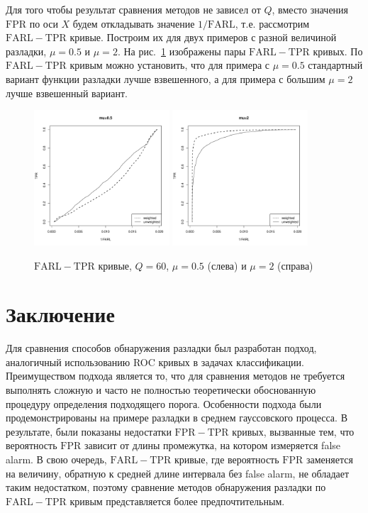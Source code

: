 \documentclass{math-mech-sci}
\newcommand{\FPR}{\mathrm{FPR}}
\newcommand{\TPR}{\mathrm{TPR}}
\newcommand{\FARL}{\mathrm{FARL}}
\begin{document}
Для того чтобы результат сравнения методов не зависел от $Q$, вместо значения $\FPR$ по оси $X$ будем откладывать значение $1/\FARL$, т.е. рассмотрим $\FARL-\TPR$ кривые. Построим их для двух примеров с разной величиной разладки, $\mu=0.5$ и $\mu =2$. На рис.~\ref{fig:arl} изображены пары $\FARL-\TPR$ кривых. По $\FARL-\TPR$ кривым можно установить, что для примера с $\mu=0.5$ стандартный вариант функции разладки лучше взвешенного, а для примера с большим $\mu=2$ лучше взвешенный вариант.

\begin{figure}
	\includegraphics[width=0.45\textwidth]{arl_0.5}
	\includegraphics[width=0.45\textwidth]{arl_2}\caption{$\mathrm{FARL}-\mathrm{TPR}$ кривые, $Q=60$, $\mu=0.5$ (слева) и $\mu=2$ (справа)}\label{fig:arl}
\end{figure}

\section{Заключение}
	Для сравнения способов обнаружения разладки был разработан
подход, аналогичный использованию ROC кривых в
задачах классификации. Преимуществом подхода является то, что для сравнения методов не требуется выполнять сложную и часто не полностью теоретически обоснованную процедуру определения подходящего порога. Особенности подхода были продемонстрированы на примере разладки в среднем гауссовского процесса. В результате, были показаны недостатки $\FPR-\TPR$ кривых, вызванные тем, что вероятность $\FPR$ зависит от длины промежутка, на котором измеряется false alarm.  В свою очередь, $\FARL-\TPR$ кривые, где вероятность $\FPR$ заменяется на величину, обратную к средней длине интервала без false alarm, не обладает таким недостатком, поэтому сравнение методов обнаружения разладки по $\FARL-\TPR$ кривым представляется более предпочтительным.
\end{document}
